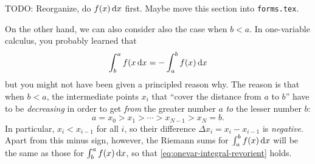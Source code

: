 \begin{eg}\label{eg:onevar-linint}
  TODO: Reorganize, do $f(x)\,\dx$ first.  Maybe move this section into \texttt{forms.tex}.

  On the other hand, we can also consider also the case when $b<a$.
  In one-variable calculus, you probably learned that
  \begin{equation}\label{eq:onevar-integral-revorient}
    \itint x b a {f(x} = - \itint x a b {f(x)}
  \end{equation}
  but you might not have been given a principled reason why.
  The reason is that when $b<a$, the intermediate points $x_i$ that ``cover the distance from $a$ to $b$'' have to be \emph{decreasing} in order to get \emph{from} the greater number $a$ \emph{to} the lesser number $b$:
  \[ a = x_0 > x_1 > \cdots > x_{N-1} > x_N = b.\]
  In particular, $x_i < x_{i-1}$ for all $i$, so their difference $\Delta x_i = x_i - x_{i-1}$ is \emph{negative}.
  Apart from this minus sign, however, the Riemann sums for $\itint x a b {f(x)}$ will be the same as those for $\itint x b a {f(x)}$, so that \cref{eq:onevar-integral-revorient} holds.
\end{eg}

